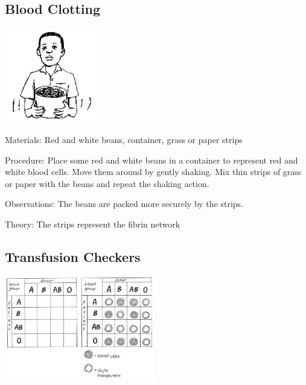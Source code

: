 \begin{multicols}{2}
\subsection{Blood Clotting} %

\begin{center}
\includegraphics[width=0.3\textwidth]{./img/source/blood-clots.png}
\end{center}

\begin{description*}
\item[Materials:]{Red and white beans, container, grass or paper strips}
\item[Procedure:]{Place some red and white beans in a container to represent red and white blood cells.
Move them around by gently shaking. Mix thin strips of grass or paper with the beans and
repeat the shaking action. }
\item[Observations:]{The beans are packed more securely by the strips.}
\item[Theory:]{The strips
represent the fibrin network }
\end{description*}

\columnbreak

\subsection{Transfusion Checkers}  %

\begin{center}
\includegraphics[width=0.49\textwidth]{./img/vso/transfusion-checkers.jpg}
\end{center}


\end{multicols}
